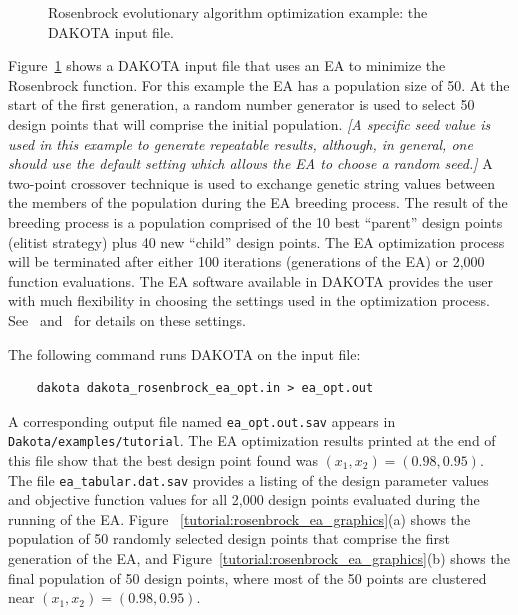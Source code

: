 \begin{figure}[ht!]
  \centering
  \begin{bigbox}
    \begin{small}
    \end{small}
  \end{bigbox}
  \caption{Rosenbrock evolutionary algorithm optimization example: the
  DAKOTA input file.}
  \label{tutorial:rosenbrock_ea}
\end{figure}

Figure~\ref{tutorial:rosenbrock_ea} shows a DAKOTA input file that
uses an EA to minimize the Rosenbrock function. For this
example the EA has a population size of 50. At the start of the first
generation, a random number generator is used to select 50 design
points that will comprise the initial population. \emph{[A specific
  seed value is used in this example to generate repeatable results,
  although, in general, one should use the default setting which
  allows the EA to choose a random seed.]} A two-point crossover
technique is used to exchange genetic string values between the
members of the population during the EA breeding process. The result
of the breeding process is a population comprised of the 10 best
``parent'' design points (elitist strategy) plus 40 new ``child''
design points. The EA optimization process will be terminated after
either 100 iterations (generations of the EA) or 2,000 function
evaluations. The EA software available in DAKOTA provides the user
with much flexibility in choosing the settings used in the
optimization process. See~\cite{RefMan} and~\cite{Har06} for details on these
settings.

The following command runs DAKOTA on the input file:
\begin{small}
\begin{verbatim}
    dakota dakota_rosenbrock_ea_opt.in > ea_opt.out
\end{verbatim}
\end{small}

A corresponding output file named \texttt{ea\_opt.out.sav} appears in
\texttt{Dakota/examples/tutorial}. The EA optimization results
printed at the end of this file show that the best design point found
was $(x_1,x_2) = (0.98,0.95)$. The file
\texttt{ea\_tabular.dat.sav} provides a listing of the design
parameter values and objective function values for all 2,000 design
points evaluated during the running of the EA.  Figure~
\ref{tutorial:rosenbrock_ea_graphics}(a) shows the population of
50 randomly selected design points that comprise the first generation
of the EA, and Figure~\ref{tutorial:rosenbrock_ea_graphics}(b)
shows the final population of 50 design points, where most of the 50
points are clustered near $(x_1,x_2) = (0.98,0.95)$.


